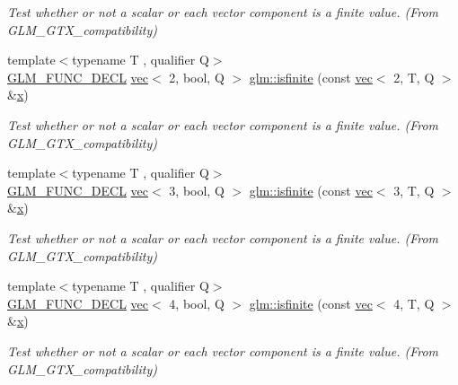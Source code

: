 \begin{DoxyCompactItemize}
\begin{DoxyCompactList}\small\item\em Test whether or not a scalar or each vector component is a finite value. (From G\+L\+M\+\_\+\+G\+T\+X\+\_\+compatibility) \end{DoxyCompactList}\item 
{\footnotesize template$<$typename T , qualifier Q$>$ }\\\hyperlink{setup_8hpp_ab2d052de21a70539923e9bcbf6e83a51}{G\+L\+M\+\_\+\+F\+U\+N\+C\+\_\+\+D\+E\+CL} \hyperlink{structglm_1_1vec}{vec}$<$ 2, bool, Q $>$ \hyperlink{group__gtx__compatibility_ga8e76dc3e406ce6a4155c2b12a2e4b084}{glm\+::isfinite} (const \hyperlink{structglm_1_1vec}{vec}$<$ 2, T, Q $>$ \&\hyperlink{_s_d_l__opengl_8h_ad0e63d0edcdbd3d79554076bf309fd47}{x})
\begin{DoxyCompactList}\small\item\em Test whether or not a scalar or each vector component is a finite value. (From G\+L\+M\+\_\+\+G\+T\+X\+\_\+compatibility) \end{DoxyCompactList}\item 
{\footnotesize template$<$typename T , qualifier Q$>$ }\\\hyperlink{setup_8hpp_ab2d052de21a70539923e9bcbf6e83a51}{G\+L\+M\+\_\+\+F\+U\+N\+C\+\_\+\+D\+E\+CL} \hyperlink{structglm_1_1vec}{vec}$<$ 3, bool, Q $>$ \hyperlink{group__gtx__compatibility_ga929ef27f896d902c1771a2e5e150fc97}{glm\+::isfinite} (const \hyperlink{structglm_1_1vec}{vec}$<$ 3, T, Q $>$ \&\hyperlink{_s_d_l__opengl_8h_ad0e63d0edcdbd3d79554076bf309fd47}{x})
\begin{DoxyCompactList}\small\item\em Test whether or not a scalar or each vector component is a finite value. (From G\+L\+M\+\_\+\+G\+T\+X\+\_\+compatibility) \end{DoxyCompactList}\item 
{\footnotesize template$<$typename T , qualifier Q$>$ }\\\hyperlink{setup_8hpp_ab2d052de21a70539923e9bcbf6e83a51}{G\+L\+M\+\_\+\+F\+U\+N\+C\+\_\+\+D\+E\+CL} \hyperlink{structglm_1_1vec}{vec}$<$ 4, bool, Q $>$ \hyperlink{group__gtx__compatibility_ga19925badbe10ce61df1d0de00be0b5ad}{glm\+::isfinite} (const \hyperlink{structglm_1_1vec}{vec}$<$ 4, T, Q $>$ \&\hyperlink{_s_d_l__opengl_8h_ad0e63d0edcdbd3d79554076bf309fd47}{x})
\begin{DoxyCompactList}\small\item\em Test whether or not a scalar or each vector component is a finite value. (From G\+L\+M\+\_\+\+G\+T\+X\+\_\+compatibility) \end{DoxyCompactList}\end{DoxyCompactItemize}


